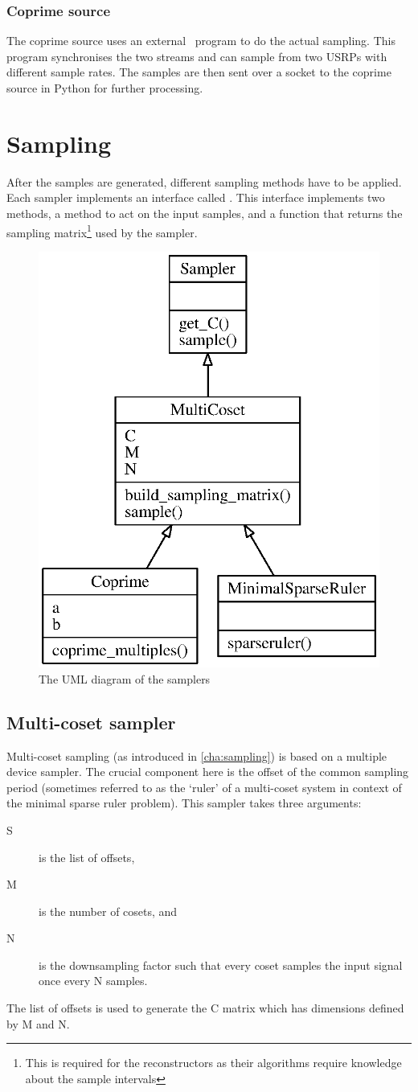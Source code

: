 \documentclass[a4paper, openany, oneside]{memoir}
\begin{document}
\subsubsection{Coprime source}
The coprime source uses an external \CC~program to do the actual sampling. This program synchronises the two streams and can sample from two USRPs with different sample rates. The samples are then sent over a socket to the coprime source in Python for further processing.


\section{Sampling}
\label{sec:sampling}
After the samples are generated, different sampling methods have to be applied. Each sampler implements an interface called . This interface implements two methods, a  method to act on the input samples, and a  function that returns the sampling matrix\footnote{This is required for the reconstructors as their algorithms require knowledge about the sample intervals} used by the sampler.

\begin{figure}
    \centering
    \includegraphics[width=0.5\linewidth]{./figures/classes_sampling.eps}
    \caption{The UML diagram of the samplers}
    \label{fig:umlclasses}
\end{figure}

\subsection{Multi-coset sampler}
\label{sub:multi_coset_sampler}
Multi-coset sampling (as introduced in \cref{cha:sampling}) is based on a multiple device sampler. The crucial component here is the offset of the common sampling period (sometimes referred to as the `ruler' of a multi-coset system in context of the minimal sparse ruler problem). This sampler takes three arguments:
\begin{description}
    \item[S] is the list of offsets,
    \item[M] is the number of cosets, and
    \item[N] is the downsampling factor such that every coset samples the input signal once every N samples.
\end{description}
The list of offsets is used to generate the C matrix which has dimensions defined by M and N.
\end{document}
